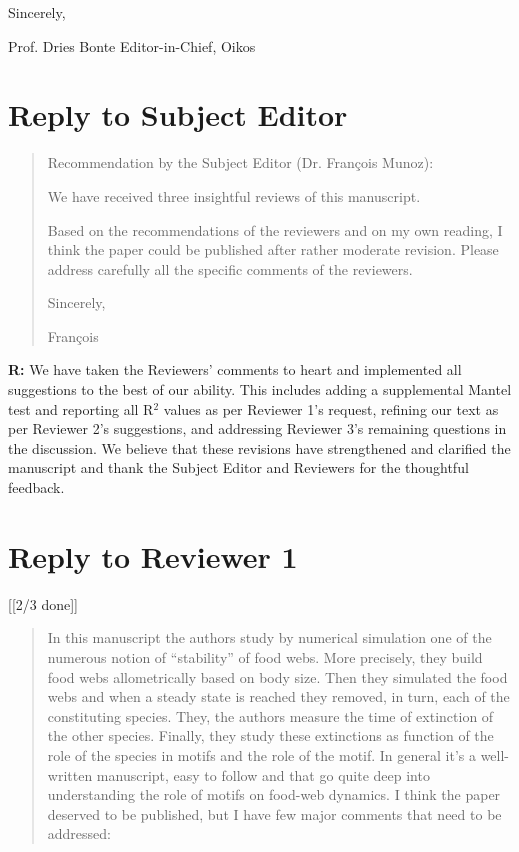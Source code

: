 \documentclass[12pt]{article}
\begin{document}
  Sincerely,

  Prof. Dries Bonte
  Editor-in-Chief, Oikos


\clearpage

\section*{Reply to Subject Editor}

  \begin{quotation}
    Recommendation by the Subject Editor (Dr. Fran\c{c}ois Munoz):

    We have received three insightful reviews of this manuscript.

    Based on the recommendations of the reviewers and on my own reading, I think the paper could be published after rather moderate revision. Please address carefully all the specific comments of the reviewers.

    Sincerely,

    Fran\c{c}ois
  \end{quotation}

  
  \textbf{R:} We have taken the Reviewers' comments to heart and implemented all suggestions to the best of our ability. This includes adding a supplemental Mantel test and reporting all R$^2$ values as per Reviewer 1's request, refining our text as per Reviewer 2's suggestions, and addressing Reviewer 3's remaining questions in the discussion. We believe that these revisions have strengthened and clarified the manuscript and thank the Subject Editor and Reviewers for the thoughtful feedback.


\clearpage

\section*{Reply to Reviewer 1} [[2/3 done]]

  \begin{quotation}

    In this manuscript the authors study by numerical simulation one of the numerous notion of “stability” of food webs. More precisely, they build food webs allometrically based on body size. Then they simulated the food webs and when a steady state is reached they removed, in turn, each of the constituting species. They, the authors measure the time of extinction of the other species. Finally, they study these extinctions as function of the role of the species in motifs and the role of the motif. In general it’s a well-written manuscript, easy to follow and that go quite deep into understanding the role of motifs on food-web dynamics. I think the paper deserved to be published, but I have few major comments that need to be addressed:

  \end{quotation}
\end{document}
